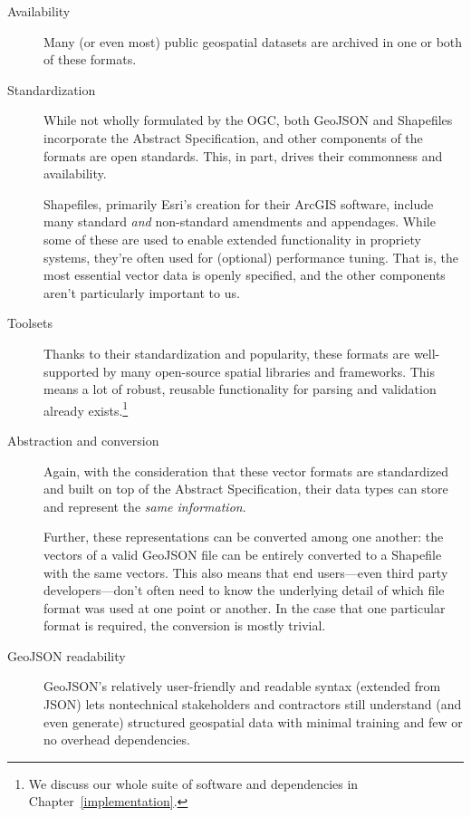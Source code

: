 \begin{description}
  \item[Availability] Many (or even most) public geospatial datasets are archived in one or both of these formats.
  \item[Standardization] While not wholly formulated by the OGC, both GeoJSON and Shapefiles incorporate the Abstract Specification, and other components of the formats are open standards. This, in part, drives their commonness and availability.
  
Shapefiles, primarily Esri's creation for their ArcGIS software, include many standard \textit{and} non-standard amendments and appendages. While some of these are used to enable extended functionality in propriety systems, they're often used for (optional) performance tuning. That is, the most essential vector data is openly specified, and the other components aren't particularly important to us.

\item[Toolsets] Thanks to their standardization and popularity, these formats  are well-supported by many open-source spatial libraries and frameworks. This means a lot of robust, reusable functionality for parsing and validation already exists.\footnote{We discuss our whole suite of software and dependencies in Chapter~\ref{implementation}.}

\item[Abstraction and conversion] Again, with the consideration that these vector formats are standardized and built on top of the Abstract Specification, their data types can store and represent the \textit{same information}.

Further, these representations can be converted among one another: the vectors of a valid GeoJSON file can be entirely converted to a Shapefile with the same vectors. This also means that end users---even third party developers---don't often need to know the underlying detail of which file format was used at one point or another. In the case that one particular format is required, the conversion is mostly trivial.

\item[GeoJSON readability] GeoJSON's relatively user-friendly and readable syntax (extended from JSON) lets nontechnical stakeholders and contractors still understand (and even generate) structured geospatial data with minimal training and few or no overhead dependencies.

\end{description}


